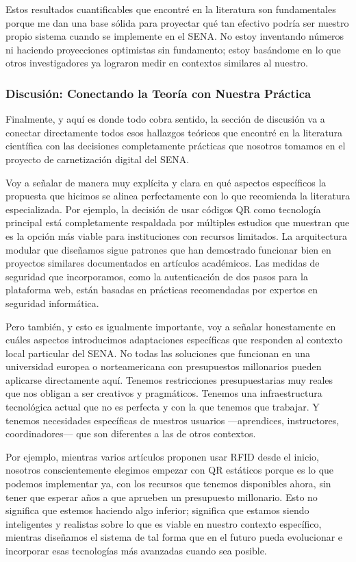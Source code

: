 Estos resultados cuantificables que encontré en la literatura son fundamentales porque me dan una base sólida para proyectar qué tan efectivo podría ser nuestro propio sistema cuando se implemente en el SENA. No estoy inventando números ni haciendo proyecciones optimistas sin fundamento; estoy basándome en lo que otros investigadores ya lograron medir en contextos similares al nuestro.

\subsubsection*{Discusión: Conectando la Teoría con Nuestra Práctica}

Finalmente, y aquí es donde todo cobra sentido, la sección de discusión va a conectar directamente todos esos hallazgos teóricos que encontré en la literatura científica con las decisiones completamente prácticas que nosotros tomamos en el proyecto de carnetización digital del SENA.

Voy a señalar de manera muy explícita y clara en qué aspectos específicos la propuesta que hicimos se alinea perfectamente con lo que recomienda la literatura especializada. Por ejemplo, la decisión de usar códigos QR como tecnología principal está completamente respaldada por múltiples estudios que muestran que es la opción más viable para instituciones con recursos limitados. La arquitectura modular que diseñamos sigue patrones que han demostrado funcionar bien en proyectos similares documentados en artículos académicos. Las medidas de seguridad que incorporamos, como la autenticación de dos pasos para la plataforma web, están basadas en prácticas recomendadas por expertos en seguridad informática.

Pero también, y esto es igualmente importante, voy a señalar honestamente en cuáles aspectos introducimos adaptaciones específicas que responden al contexto local particular del SENA. No todas las soluciones que funcionan en una universidad europea o norteamericana con presupuestos millonarios pueden aplicarse directamente aquí. Tenemos restricciones presupuestarias muy reales que nos obligan a ser creativos y pragmáticos. Tenemos una infraestructura tecnológica actual que no es perfecta y con la que tenemos que trabajar. Y tenemos necesidades específicas de nuestros usuarios —aprendices, instructores, coordinadores— que son diferentes a las de otros contextos.

Por ejemplo, mientras varios artículos proponen usar RFID desde el inicio, nosotros conscientemente elegimos empezar con QR estáticos porque es lo que podemos implementar ya, con los recursos que tenemos disponibles ahora, sin tener que esperar años a que aprueben un presupuesto millonario. Esto no significa que estemos haciendo algo inferior; significa que estamos siendo inteligentes y realistas sobre lo que es viable en nuestro contexto específico, mientras diseñamos el sistema de tal forma que en el futuro pueda evolucionar e incorporar esas tecnologías más avanzadas cuando sea posible.

